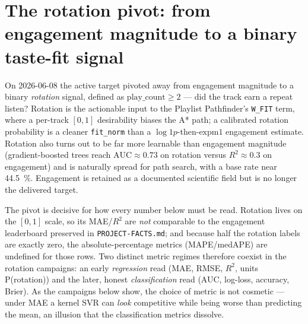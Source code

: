 \documentclass[11pt]{article}
\newcommand{\medape}{medAPE}
\newcommand{\rsq}{$R^2$}
\begin{document}
\section{The rotation pivot: from engagement magnitude to a binary taste-fit signal}
\label{sec:rotation-pivot}
On 2026-06-08 the active target pivoted away from engagement magnitude to a
binary \emph{rotation} signal, defined as $\text{play\_count} \ge 2$ --- did
the track earn a repeat listen? Rotation is the actionable input to the
Playlist Pathfinder's \texttt{W\_FIT} term, where a per-track $[0,1]$
desirability biases the A* path; a calibrated rotation probability is a
cleaner \texttt{fit\_norm} than a $\log1p$-then-$\text{expm1}$ engagement
estimate. Rotation also turns out to be far more learnable than engagement
magnitude (gradient-boosted trees reach $\text{AUC}\approx 0.73$ on rotation
versus \rsq{}$\approx 0.3$ on engagement) and is naturally spread for path
search, with a base rate near \SI{44.5}{\percent}. Engagement is retained as a
documented scientific field but is no longer the delivered target.

The pivot is decisive for how every number below must be read. Rotation lives
on the $[0,1]$ scale, so its MAE/\rsq{} are \emph{not} comparable to the
engagement leaderboard preserved in \texttt{PROJECT-FACTS.md}; and because half
the rotation labels are exactly zero, the absolute-percentage metrics
(MAPE/\medape{}) are undefined for those rows. Two distinct metric regimes
therefore coexist in the rotation campaigns: an early \emph{regression} read
(MAE, RMSE, \rsq{}, units P(rotation)) and the later, honest
\emph{classification} read (AUC, log-loss, accuracy, Brier). As the campaigns
below show, the choice of metric is not cosmetic --- under MAE a kernel SVR can
\emph{look} competitive while being worse than predicting the mean, an illusion
that the classification metrics dissolve.
\end{document}
